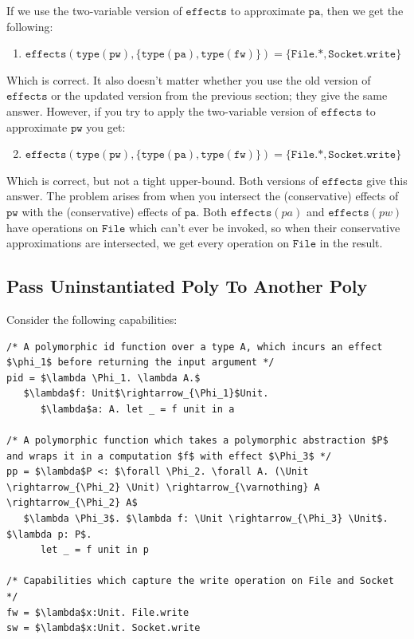\documentclass{llncs}
\newcommand{\keywadj}[1]{\mathtt{#1}}
\newcommand{\kwa}[1]{\keywadj{ #1 }}
\newcommand{\Unit}[0]{ \kwa{Unit} }
\newcommand{\fx}[1]{ \kwa{effects}(#1) }
\begin{document}
\noindent
If we use the two-variable version of $\kwa{effects}$ to approximate $\kwa{pa}$, then we get the following:

\begin{enumerate}
	\item $\kwa{effects(type(pw), \{type(pa), type(fw)\}) = \{ File.*, Socket.write \}}$
\end{enumerate}

\noindent
Which is correct. It also doesn't matter whether you use the old version of $\kwa{effects}$ or the updated version from the previous section; they give the same answer. However, if you try to apply the two-variable version of $\kwa{effects}$ to approximate $\kwa{pw}$ you get:

\begin{enumerate}
	\setcounter{enumi}{1}
	\item $\kwa{effects(type(pw), \{type(pa), type(fw)\}) = \{File.*, Socket.write\}}$
\end{enumerate}

Which is correct, but not a tight upper-bound. Both versions of $\kwa{effects}$ give this answer. The problem arises from when you intersect the (conservative) effects of $\kwa{pw}$ with the (conservative) effects of $\kwa{pa}$. Both $\fx{pa}$ and $\fx{pw}$ have operations on $\kwa{File}$ which can't ever be invoked, so when their conservative approximations are intersected, we get every operation on $\kwa{File}$ in the result.


\subsection{Pass Uninstantiated Poly To Another Poly}

Consider the following capabilities:

\begin{lstlisting}
/* A polymorphic id function over a type A, which incurs an effect $\phi_1$ before returning the input argument */
pid = $\lambda \Phi_1. \lambda A.$
   $\lambda$f: Unit$\rightarrow_{\Phi_1}$Unit.
      $\lambda$a: A. let _ = f unit in a

/* A polymorphic function which takes a polymorphic abstraction $P$ and wraps it in a computation $f$ with effect $\Phi_3$ */
pp = $\lambda$P <: $\forall \Phi_2. \forall A. (\Unit \rightarrow_{\Phi_2} \Unit) \rightarrow_{\varnothing} A \rightarrow_{\Phi_2} A$
   $\lambda \Phi_3$. $\lambda f: \Unit \rightarrow_{\Phi_3} \Unit$. $\lambda p: P$.
      let _ = f unit in p

/* Capabilities which capture the write operation on File and Socket */
fw = $\lambda$x:Unit. File.write
sw = $\lambda$x:Unit. Socket.write
\end{lstlisting}
\end{document}
